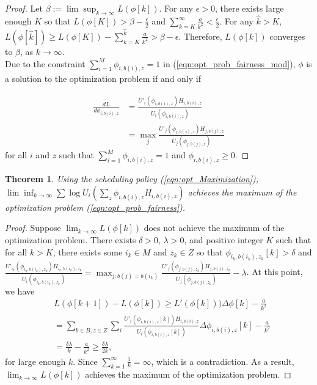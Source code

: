 \documentclass[conference]{IEEEtran}
\newtheorem{thm}{Theorem}[section]
\begin{document}
\begin{proof}
Let $\beta := \lim \sup_{k \rightarrow \infty} L(\phi[k])$. For any $\epsilon > 0$, there exists large enough $K$ so that $L(\phi[K])>\beta-\frac{\epsilon}{2}$ and $\sum_{k=K}^{\infty}\frac{a}{k^2}<\frac{\epsilon}{2}$. For any $\hat{k}>K$, $L(\phi[\hat{k}]) \geq L(\phi[K])-\sum_{k=K}^{\hat{k}}\frac{a}{k^2} > \beta-\epsilon$. Therefore, $L(\phi[k])$ converges to $\beta$, as $k \rightarrow \infty$. \\  
   
Due to the constraint $\sum_{i=1}^M \phi_{i,b(i),z} = 1$ in (\ref{eqn:opt_prob_fairness_mod}), $\phi$ is a solution to the optimization problem if and only if 

\begin{equation}\label{eqn:opt_Maximization}
\begin{aligned}
\frac{dL}{d\phi_{i,b(i),z}} & =\frac{U'_i(\phi_{i,b(i),z})H_{i,b(i),z}}{U_i(\phi_{i,b(i),z})} \\ 
& =\max_j\frac{U'_j(\phi_{j,b(j),z})H_{j,b(j),z}}{U_j(\phi_{j,b(j),z})} 
\end{aligned}
\end{equation}
for all $i$ and $z$ such that $\sum_{i=1}^{M}\phi_{i,b(i),z}=1$ and $\phi_{i,b(i),z} \geq 0$.

\end{proof}

\begin{thm}\label{thm:limitmax}
Using the scheduling policy (\ref{eqn:opt_Maximization}), $\lim \inf_{k \rightarrow \infty} \sum \log U_i(\sum_z\phi_{i,b(i),z}H_{i,b(i),z})$ achieves the maximum of the optimization problem (\ref{eqn:opt_prob_fairness}). 
\end{thm}
\begin{proof}
Suppose $\lim_{k \rightarrow \infty}L(\phi[k])$ does not achieve the maximum of the optimization problem. There exists $\delta >   0$, $\lambda > 0$, and positive integer $K$ such that for all $k > K$, there exists some $i_k \in M$ and $z_k \in Z$ so that $\phi_{i_k,b(i_k),z_k}[k]>\delta$ and  $\frac{U'_{i_k}(\phi_{i_k,b(i_k),z_k})H_{i_k,b(i_k),z_k}}{U_i(\phi_{i_k,b(i_k),z_k})}=\max_{j:b(j)=b(i_k)}\frac{U'_j(\phi_{j,b(j),z_k})H_{j,b(j),z_k}}{U_j(\phi_{j,b(j),z_k})}-\lambda$. At this point, we have 
\begin{equation*}\label{eqn:L_maximize}
\begin{aligned}
& L(\phi[k+1])-L(\phi[k]) \geq L'(\phi[k]))\Delta \phi[k]-\frac{a}{k^2}\\
& =\sum_{b \in B, z \in Z}\sum_{i}\frac{U'_i(\phi_{i,b(i),z}[k])H_{i,b(i),z}}{U_i(\phi_{i,b(i),z}[k])}\Delta\phi_{i,b(i),z}[k]-\frac{a}{k^2}\\
& =\frac{\delta\lambda}{k}-\frac{a}{k^2} \geq \frac{\delta\lambda}{2k},
\end{aligned}
\end{equation*}
for large enough $k$. Since $\sum_{k=1}^\infty \frac{1}{k}=\infty$, which is a contradiction. As a result, $\lim_{k \rightarrow \infty}L(\phi[k])$ achieves the maximum of the optimization problem.
\end{proof}
\end{document}
